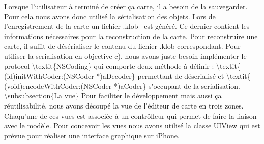 		Lorsque l'utilisateur à terminé de créer ça carte, il a besoin de la sauvegarder. Pour cela nous avons donc utilisé la sérialisation des objets. Lors de l'enregistrement de la carte un fichier \og .klob \fg \ est généré. Ce dernier contient les informations nécessaires pour la reconstruction de la carte. Pour reconstruire une carte, il suffit de désérialiser le contenu du fichier .klob correspondant. Pour utiliser la serialisation en \gls{objective-c), nous avons juste besoin implémenter le protocol \textit{NSCoding} qui comporte deux méthode à définir : 
		\textit{- (id)initWithCoder:(NSCoder *)aDecoder} permettant de déserialisé et \textit{- (void)encodeWithCoder:(NSCoder *)aCoder} s'occupant de la serialisation.
	
	\subsubsection{La vue}
		Pour faciliter le développement mais aussi ça réutilisabilité, nous avons découpé la vue de l'éditeur de carte en trois zones. Chaqu'une de ces vues est associée à un contrôlleur qui permet de faire la liaison avec le modèle. Pour concevoir les vues nous avons utilisé la classe UIView qui est prévue pour réaliser une interface graphique sur iPhone. 
			
}
